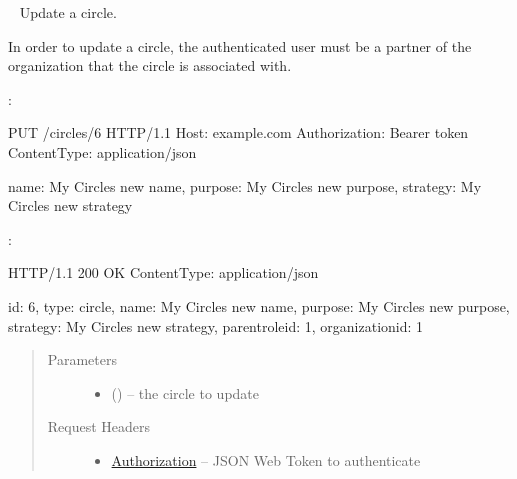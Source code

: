 \documentclass[letterpaper,10pt,english]{sphinxmanual}
\begin{document}
\begin{fulllineitems}
\label{\detokenize{resources/circle:put--circles-(circle_id)}}~
Update a circle.

In order to update a circle, the authenticated user must be a partner
of the organization that the circle is associated with.

:

\begin{sphinxVerbatim}[commandchars=\\\{\}]
PUT /circles/6 HTTP/1.1
Host: example.com
Authorization: Bearer \PYGZlt{}token\PYGZgt{}
Content\PYGZhy{}Type: application/json

\PYGZob{}
    \PYGZsq{}name\PYGZsq{}: \PYGZsq{}My Circle\PYGZsq{}s new name\PYGZsq{},
    \PYGZsq{}purpose\PYGZsq{}: \PYGZsq{}My Circle\PYGZsq{}s new purpose\PYGZsq{},
    \PYGZsq{}strategy\PYGZsq{}: \PYGZsq{}My Circle\PYGZsq{}s new strategy\PYGZsq{}
\PYGZcb{}
\end{sphinxVerbatim}

:

\begin{sphinxVerbatim}[commandchars=\\\{\}]
HTTP/1.1 200 OK
Content\PYGZhy{}Type: application/json

\PYGZob{}
    \PYGZsq{}id\PYGZsq{}: 6,
    \PYGZsq{}type\PYGZsq{}: \PYGZsq{}circle\PYGZsq{},
    \PYGZsq{}name\PYGZsq{}: \PYGZsq{}My Circle\PYGZsq{}s new name\PYGZsq{},
    \PYGZsq{}purpose\PYGZsq{}: \PYGZsq{}My Circle\PYGZsq{}s new purpose\PYGZsq{},
    \PYGZsq{}strategy\PYGZsq{}: \PYGZsq{}My Circle\PYGZsq{}s new strategy\PYGZsq{},
    \PYGZsq{}parent\PYGZus{}role\PYGZus{}id\PYGZsq{}: 1,
    \PYGZsq{}organization\PYGZus{}id\PYGZsq{}: 1
\PYGZcb{}
\end{sphinxVerbatim}
\begin{quote}\begin{description}
\item[{Parameters}] \leavevmode\begin{itemize}
\item {} 
 () -- the circle to update

\end{itemize}

\item[{Request Headers}] \leavevmode\begin{itemize}
\item {} 
\href{http://tools.ietf.org/html/rfc7235\#section-4.2}{Authorization} -- JSON Web Token to authenticate


\end{itemize}
\end{description}
\end{quote}
\end{fulllineitems}
\end{document}

